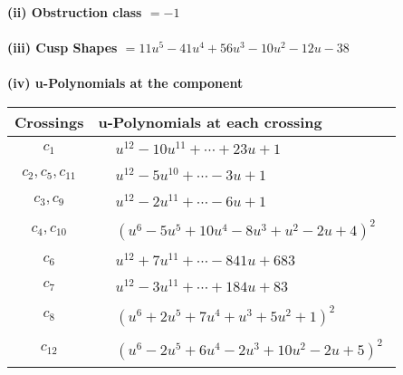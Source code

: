 \documentclass[1p]{elsarticle_modified}
\theoremstyle{definition}
\begin{document}
\flushleft \textbf{(ii) Obstruction class $= -1$}\\~\\
\flushleft \textbf{(iii) Cusp Shapes $= 11 u^5-41 u^4+56 u^3-10 u^2-12 u-38$}\\~\\
\newpage\renewcommand{\arraystretch}{1}
\flushleft \textbf{(iv) u-Polynomials at the component}\newline \\
\begin{tabular}{m{50pt}|m{274pt}}
Crossings & \hspace{64pt}u-Polynomials at each crossing \\
\hline $$\begin{aligned}c_{1}\end{aligned}$$&$\begin{aligned}
&u^{12}-10 u^{11}+\cdots+23 u+1
\end{aligned}$\\
\hline $$\begin{aligned}c_{2},c_{5},c_{11}\end{aligned}$$&$\begin{aligned}
&u^{12}-5 u^{10}+\cdots-3 u+1
\end{aligned}$\\
\hline $$\begin{aligned}c_{3},c_{9}\end{aligned}$$&$\begin{aligned}
&u^{12}-2 u^{11}+\cdots-6 u+1
\end{aligned}$\\
\hline $$\begin{aligned}c_{4},c_{10}\end{aligned}$$&$\begin{aligned}
&(u^6-5 u^5+10 u^4-8 u^3+u^2-2 u+4)^2
\end{aligned}$\\
\hline $$\begin{aligned}c_{6}\end{aligned}$$&$\begin{aligned}
&u^{12}+7 u^{11}+\cdots-841 u+683
\end{aligned}$\\
\hline $$\begin{aligned}c_{7}\end{aligned}$$&$\begin{aligned}
&u^{12}-3 u^{11}+\cdots+184 u+83
\end{aligned}$\\
\hline $$\begin{aligned}c_{8}\end{aligned}$$&$\begin{aligned}
&(u^6+2 u^5+7 u^4+u^3+5 u^2+1)^2
\end{aligned}$\\
\hline $$\begin{aligned}c_{12}\end{aligned}$$&$\begin{aligned}
&(u^6-2 u^5+6 u^4-2 u^3+10 u^2-2 u+5)^2
\end{aligned}$\\
\hline
\end{tabular}\\~\\
\end{document}
